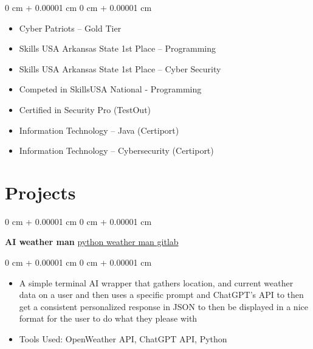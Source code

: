 \documentclass[10pt, letterpaper]{article}
\newenvironment{highlights}{
    \begin{itemize}[
        topsep=0.10 cm,
        parsep=0.10 cm,
        partopsep=0pt,
        itemsep=0pt,
        leftmargin=0 cm + 10pt
    ]
}{
    \end{itemize}
} %
\newenvironment{onecolentry}{
    \begin{adjustwidth}{
        0 cm + 0.00001 cm
    }{
        0 cm + 0.00001 cm
    }
}{
    \end{adjustwidth}
} %
\newenvironment{twocolentry}[2][]{
    \onecolentry
    \def\secondColumn{#2}
    \setcolumnwidth{\fill, 4.5 cm}
    \begin{paracol}{2}
}{
    \switchcolumn \raggedleft \secondColumn
    \end{paracol}
    \endonecolentry
} %
\begin{document}
        \vspace{0.10 cm}
        \begin{onecolentry}
            \begin{highlights}
                \item Cyber Patriots – Gold Tier
                \item Skills USA Arkansas State 1st Place – Programming
                \item Skills USA Arkansas State 1st Place – Cyber Security
                \item Competed in SkillsUSA National - Programming 
                \item Certified in Security Pro (TestOut)
                \item Information Technology – Java (Certiport)
                \item Information Technology – Cybersecurity (Certiport)
            \end{highlights}
        \end{onecolentry}





     
    
    \section{Projects}

        \begin{twocolentry}{
            \href{https://gitlab.com/paradigms1/pythonaiwetherman}{python weather man gitlab}
        }
            \textbf{AI weather man}\end{twocolentry}

        \vspace{0.10 cm}
        \begin{onecolentry}
            \begin{highlights}
                \item A simple terminal AI wrapper that gathers location, and current weather data on a user and then uses a specific prompt and ChatGPT's API to then get a consistent personalized response in JSON to then be displayed in a nice format for the user to do what they please with
                \item Tools Used: OpenWeather API, ChatGPT API, Python 
            \end{highlights}
        \end{onecolentry}
\end{document}
